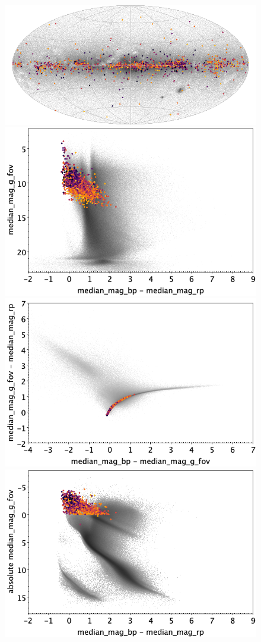\documentclass[longauth]{aa}
\begin{document}
\begin{appendix}
\begin{figure}
\centering
{}
\includegraphics[width=0.6\hsize]{figures/appendix/BCEP_cls_sky.png} 
 \\ %
\vspace{4mm}
 \includegraphics[width=0.45\hsize]{figures/appendix/BCEP_cls_cm.png}  %
\hspace{2mm}
 \includegraphics[width=0.45\hsize]{figures/appendix/BCEP_cls_cc.png} \\ %
\vspace{4mm}
 \includegraphics[width=0.45\hsize]{figures/appendix/BCEP_cls_cam.png}  %

\end{figure}
\end{appendix}
\end{document}
